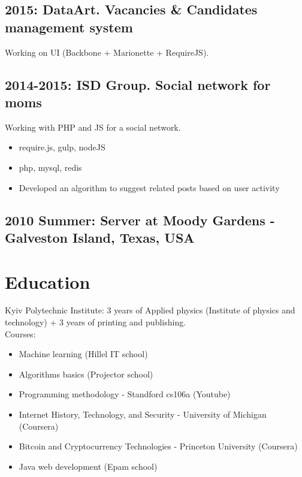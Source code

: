 \documentclass[a4paper, 14pt]{article}
\begin{document}
  \subsection{2015: DataArt. Vacancies \& Candidates management system}
    Working on UI (Backbone + Marionette + RequireJS).

	\subsection{2014-2015: ISD Group. Social network for moms}
    Working with PHP and JS for a social network.
      \begin{itemize}
        \item require.js, gulp, nodeJS \\
        \item php, mysql, redis \\
        \item Developed an algorithm to suggest related posts based on user activity
      \end{itemize}

  \subsection{2010 Summer: Server at Moody Gardens - Galveston Island, Texas, USA}

\section{Education}
  Kyiv Polytechnic Institute: 3 years of Applied physics (Institute of physics and technology) + 3 years of printing and publishing. \\
  Courses:
  \begin{itemize}
    \item Machine learning (Hillel IT school) \\
    \item Algorithms basics (Projector school) \\
    \item Programming methodology - Standford cs106a (Youtube) \\
    \item Internet History, Technology, and Security - University of Michigan (Coursera) \\
    \item Bitcoin and Cryptocurrency Technologies - Princeton University (Coursera) \\
    \item Java web development (Epam school)
  \end{itemize}
\end{document}
